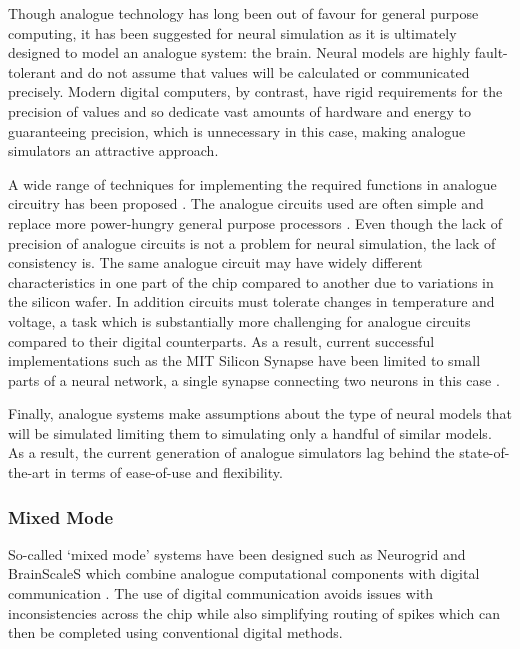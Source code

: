 				Though analogue technology has long been out of favour for general
				purpose computing, it has been suggested for neural simulation as it is
				ultimately designed to model an analogue system: the brain. Neural
				models are highly fault-tolerant and do not assume that values will be
				calculated or communicated precisely. Modern digital computers, by
				contrast, have rigid requirements for the precision of values and so
				dedicate vast amounts of hardware and energy to guaranteeing precision,
				which is unnecessary in this case, making analogue simulators an
				attractive approach.
				
				A wide range of techniques for implementing the required functions in
				analogue circuitry has been proposed
				\cite{graf86,holler89,agranat90,azghadi13}. The analogue circuits used
				are often simple and replace more power-hungry general purpose
				processors \cite{misra10}. Even though the lack of precision of analogue
				circuits is not a problem for neural simulation, the lack of consistency
				is. The same analogue circuit may have widely different characteristics
				in one part of the chip compared to another due to variations in the
				silicon wafer. In addition circuits must tolerate changes in temperature
				and voltage, a task which is substantially more challenging for analogue
				circuits compared to their digital counterparts. As a result, current
				successful implementations such as the MIT Silicon Synapse have been
				limited to small parts of a neural network, a single synapse connecting
				two neurons in this case \cite{rachmuth11}.
				
				Finally, analogue systems make assumptions about the type of neural models
				that will be simulated limiting them to simulating only a handful of
				similar models. As a result, the current generation of analogue
				simulators lag behind the state-of-the-art in terms of ease-of-use and
				flexibility.
			
			\subsubsection{Mixed Mode}
				
				So-called `mixed mode' systems have been designed such as Neurogrid and
				BrainScaleS which combine analogue computational components with digital
				communication \cite{choudhary12,maguire07}. The use of digital
				communication avoids issues with inconsistencies across the chip while
				also simplifying routing of spikes which can then be completed using
				conventional digital methods.
				
